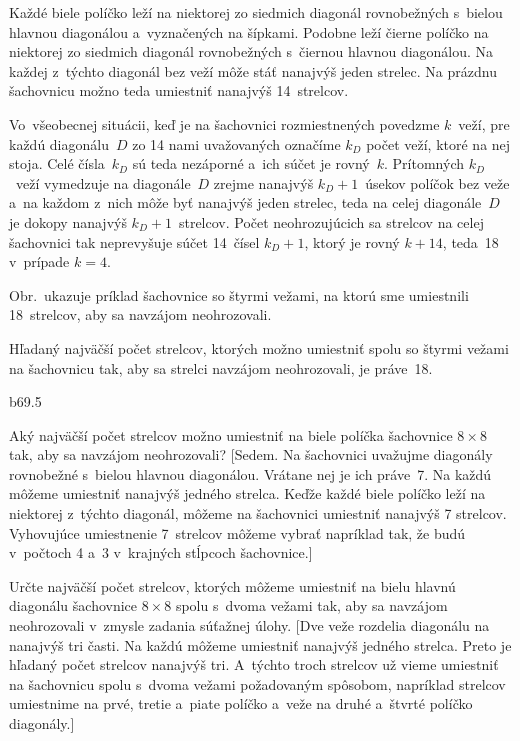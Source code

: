 {%
Každé biele políčko leží na niektorej zo siedmich diagonál rovnobežných s~bielou
hlavnou diagonálou a~vyznačených na \obr{} šípkami. Podobne leží čierne políčko na
niektorej zo siedmich diagonál rovnobežných s~čiernou hlavnou diagonálou. Na
každej z~týchto diagonál bez veží môže stáť nanajvýš jeden strelec.
Na prázdnu šachovnicu možno teda umiestniť nanajvýš 14~strelcov.

Vo~všeobecnej situácii, keď je na šachovnici rozmiestnených povedzme $k$~veží,
pre každú diagonálu~$D$ zo 14 nami uvažovaných označíme $k_D$ počet
veží, ktoré na nej stoja. Celé čísla~$k_D$ sú teda nezáporné a~ich
súčet je rovný~$k$. Prítomných $k_D$~veží vymedzuje na diagonále~$D$
zrejme nanajvýš ${k_D+1}$~úsekov políčok bez veže a~na každom z~nich môže byť
nanajvýš jeden strelec, teda na celej diagonále~$D$ je dokopy nanajvýš
${k_D+1}$~strelcov. Počet neohrozujúcich sa strelcov na celej šachovnici tak
neprevyšuje súčet 14~čísel $k_D+1$, ktorý je rovný $k+14$, teda~18
v~prípade $k=4$.
%

Obr.\,\obrnum{} ukazuje príklad šachovnice so štyrmi vežami, na ktorú sme
umiestnili 18~strelcov, aby sa navzájom neohrozovali.

\odpoved
Hľadaný najväčší
počet strelcov, ktorých možno umiestniť spolu so štyrmi vežami na šachovnicu
tak, aby sa strelci navzájom neohrozovali, je práve~18.

\mppic b69.5 \par



Aký najväčší počet strelcov možno umiestniť na biele políčka šachovnice
$8\times8$ tak, aby sa navzájom neohrozovali?
[Sedem. Na šachovnici uvažujme diagonály rovnobežné s~bielou hlavnou
diagonálou. Vrátane nej je ich práve~7. Na každú môžeme umiestniť nanajvýš
jedného strelca. Keďže každé biele políčko leží na niektorej z~týchto
diagonál, môžeme na šachovnici umiestniť nanajvýš 7 strelcov.
Vyhovujúce umiestnenie 7~strelcov môžeme vybrať napríklad tak, že budú
v~počtoch 4 a~3 v~krajných stĺpcoch šachovnice.]

Určte najväčší počet strelcov, ktorých môžeme umiestniť na bielu hlavnú
diagonálu šachovnice $8\times8$ spolu s~dvoma vežami tak, aby sa
navzájom neohrozovali v~zmysle zadania súťažnej úlohy. [Dve veže rozdelia
diagonálu na nanajvýš tri časti. Na každú môžeme umiestniť nanajvýš jedného
strelca. Preto je hľadaný počet strelcov nanajvýš tri. A~týchto troch strelcov
už vieme umiestniť na šachovnicu spolu s~dvoma vežami požadovaným
spôsobom, napríklad strelcov umiestnime na prvé, tretie a~piate políčko a~veže
na druhé a~štvrté políčko diagonály.]

}
